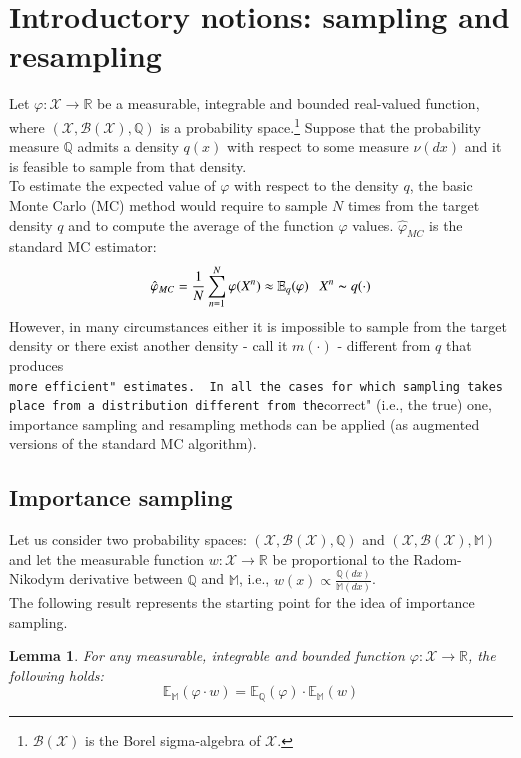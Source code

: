 \documentclass[
]{book}
\theoremstyle{break}
\newtheorem{lemma}{Lemma}
\theoremstyle{nonumberplain}
\begin{document}
\section{Introductory notions: sampling and resampling}\label{pf_intro}

Let \(\varphi: \mathcal X\rightarrow \mathbb R\) be a measurable,
integrable and bounded real-valued function, where
\((\mathcal X,\mathcal B(\mathcal X),\mathbb Q)\) is a probability
space.\footnote{$\mathcal B(\mathcal X)$ is the Borel sigma-algebra of $\mathcal X$.}
Suppose that the probability measure \(\mathbb Q\) admits a density
\(q(x)\) with respect to some measure \(\nu(dx)\) and it is feasible to
sample from that density.\\
To estimate the expected value of \(\varphi\) with respect to the
density \(q\), the basic Monte Carlo (MC) method would require to sample
\(N\) times from the target density \(q\) and to compute the average of
the function \(\varphi\) values. \(\hat \varphi_{MC}\) is the standard
MC estimator: \begin{equation*}
   \hat \varphi_{MC}=\frac{1}{N} \sum_{n=1}^N\varphi (X^n)\approx \mathbb E_q(\varphi)~~~X^n\thicksim q(\cdot)
\end{equation*} However, in many circumstances either it is impossible
to sample from the target density or there exist another density - call
it \(m(\cdot)\) - different from \(q\) that produces
\texttt{more\ efficient"\ estimates.\ \ In\ all\ the\ cases\ for\ which\ sampling\ takes\ place\ from\ a\ distribution\ different\ from\ the}correct"
(i.e., the true) one, importance sampling and resampling methods can be
applied (as augmented versions of the standard MC algorithm).

\subsection{Importance sampling}

Let us consider two probability spaces:
\((\mathcal X,\mathcal B(\mathcal X),\mathbb Q)\) and
\((\mathcal X,\mathcal B(\mathcal X),\mathbb M)\) and let the measurable
function \(w:\mathcal X\rightarrow \mathbb R\) be proportional to the
Radom-Nikodym derivative between \(\mathbb Q\) and \(\mathbb M\), i.e.,
\(w(x)\propto\frac{\mathbb Q(dx)}{\mathbb M(dx)}\).\\
The following result represents the starting point for the idea of
importance sampling.

\begin{lemma}\label{lemma_imp_sam_1}
For any measurable, integrable and bounded function $\varphi: \mathcal X\rightarrow \mathbb R$, the following holds:
\begin{equation}
    \mathbb E_\mathbb M(\varphi \cdot w)=\mathbb E_\mathbb Q(\varphi)\cdot \mathbb E_\mathbb M(w)
\end{equation}
\end{lemma}
\end{document}
